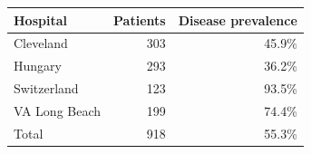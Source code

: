 \begin{tabular}{lrr}
\toprule
Hospital & Patients & Disease prevalence \\
\midrule
Cleveland & 303 & 45.9\% \\
Hungary & 293 & 36.2\% \\
Switzerland & 123 & 93.5\% \\
VA Long Beach & 199 & 74.4\% \\
\midrule Total & 918 & 55.3\% \\
\bottomrule
\end{tabular}
